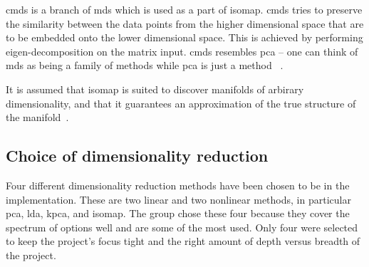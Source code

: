 \gls{cmds} is a branch of \gls{mds} which is used as a part of isomap. \gls{cmds} tries to preserve the similarity between the data points from the higher dimensional space that are to be embedded onto the lower dimensional space. This is achieved by performing eigen-decomposition on the matrix input. \gls{cmds} resembles \gls{pca} -- one can think of \gls{mds} as being a family of methods while \gls{pca} is just a method~\cite{difference-between-pca-and-mds} \cite{Multidimensional-Scaling-Sammon-Mapping-and-Isomap}.

It is assumed that \gls{isomap} is suited to discover manifolds of arbirary dimensionality, and that it guarantees an approximation of the true structure of the manifold~\cite{tennenbaum}.




\subsection{Choice of dimensionality reduction}
Four different dimensionality reduction methods have been chosen to be in the implementation. These are two linear and two nonlinear methods, in particular \gls{pca}, \gls{lda}, \gls{kpca}, and \gls{isomap}. The group chose these four because they cover the spectrum of options well and are some of the most used. Only four were selected to keep the project's focus tight and the right amount of depth versus breadth of the project.






